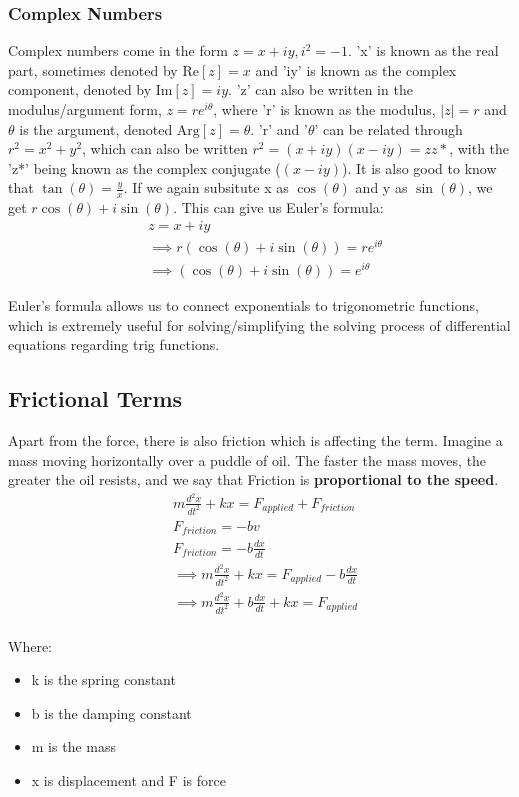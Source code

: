\documentclass[10pt]{report}
\begin{document}
{\subsubsection{Complex Numbers}
\par{Complex numbers come in the form $z=x+iy, i^{2}=-1$. 'x' is known as the real part, sometimes denoted by $\mathrm{Re}\left[z\right]=x$ and 'iy' is known as the complex component, denoted by $\mathrm{Im}\left[z\right]=iy$. 'z' can also be written in the modulus/argument form, $z=re^{i\theta}$, where 'r' is known as the modulus, $|z|=r$ and  $\theta$ is the argument, denoted $\mathrm{Arg}\left[z\right]=\theta$. 'r' and '$\theta$' can be related through $r^{2}=x^{2}+y^{2}$, which can also be written $r^{2}=\left(x+iy\right)\left(x-iy\right)=zz*$, with the 'z*' being known as the complex conjugate ($\left(x-iy\right)$). It is also good to know that $\tan\left(\theta\right)=\frac{y}{x}$. If we again subsitute x as $\cos\left(\theta\right)$ and y as $\sin\left(\theta\right)$, we get $r\cos\left(\theta\right)+i\sin\left(\theta\right)$. This can give us Euler's formula:}
\begin{align*}
	& z=x+iy \\
	& \implies r\left(\cos\left(\theta\right)+i\sin\left(\theta\right)\right)= re^{i\theta} \\
	& \implies \left(\cos\left(\theta\right)+i\sin\left(\theta\right)\right)= e^{i\theta} 
\end{align*}
\par{Euler's formula allows us to connect exponentials to trigonometric functions, which is extremely useful for solving/simplifying the solving process of differential equations regarding trig functions. }
\subsection{Frictional Terms}
\par{Apart from the force, there is also friction which is affecting the term. Imagine a mass moving horizontally over a puddle of oil. The faster the mass moves, the greater the oil resists, and we say that Friction is \textbf{proportional to the speed}.}
\begin{align*}
 	& m\frac{d^{2}x}{dt^{2}}+kx=F_{applied}+F_{friction} \\
	& F_{friction}=-bv \\
	& F_{friction}=-b\frac{dx}{dt} \\
	& \implies m\frac{d^{2}x}{dt^{2}}+kx=F_{applied}-b\frac{dx}{dt} \\
	& \implies m\frac{d^{2}x}{dt^{2}}+b\frac{dx}{dt}+kx=F_{applied} \\
\end{align*}
\par{Where: 
\begin{itemize}
	\item{k is the spring constant}
	\item{b is the damping constant}
	\item{m is the mass}
	\item{x is displacement and F is force}
\end{itemize}}
}
\end{document}
